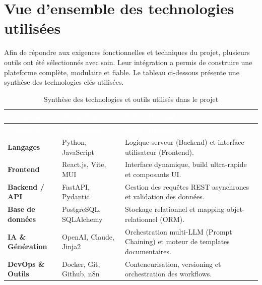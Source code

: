 \documentclass[12pt, a4paper]{report}
\begin{document}
\section{Vue d’ensemble des technologies utilisées}
Afin de répondre aux exigences fonctionnelles et techniques du projet, plusieurs outils ont été sélectionnés avec soin. Leur intégration a permis de construire une plateforme complète, modulaire et fiable. Le tableau ci-dessous présente une synthèse des technologies clés utilisées.

\begin{longtable}{|p{3.5cm}|p{3.5cm}|p{\dimexpr\textwidth-7.8cm}|}
    \hline
    \rowcolor{ChapColor}
    \textcolor{white}{\textbf{Catégorie}} & \textcolor{white}{\textbf{Technologie}} & \textcolor{white}{\textbf{Rôle principal}} \\ \hline
    \endfirsthead
    
    \hline
    \rowcolor{ChapColor}
    \textcolor{white}{\textbf{Catégorie}} & \textcolor{white}{\textbf{Technologie}} & \textcolor{white}{\textbf{Rôle principal}} \\ \hline
    \endhead

    \hline
    \endfoot

    \hline
    \caption{Synthèse des technologies et outils utilisés dans le projet} 
    \label{tab:technologies_outils}
    \endlastfoot

    \textbf{Langages} & Python, JavaScript & Logique serveur (Backend) et interface utilisateur (Frontend). \\ \hline
    \textbf{Frontend} & React.js, Vite, MUI & Interface dynamique, build ultra-rapide et composants UI. \\ \hline
    \textbf{Backend / API} & FastAPI, Pydantic & Gestion des requêtes REST asynchrones et validation des données. \\ \hline
    \textbf{Base de données} & PostgreSQL, SQLAlchemy & Stockage relationnel et mapping objet-relationnel (ORM). \\ \hline
    \textbf{IA \& Génération} & OpenAI, Claude, Jinja2 & Orchestration multi-LLM (Prompt Chaining) et moteur de templates documentaires. \\ \hline
    \textbf{DevOps \& Outils} & Docker, Git, Github, n8n & Conteneurisation, versioning et orchestration des workflows. \\ 
\end{longtable}
\end{document}
